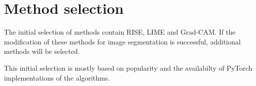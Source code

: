 \section{Method selection}
The initial selection of methods contain RISE, LIME and Grad-CAM. If the modification of these methods for image segmentation is successful, additional methods will be selected.

This initial selection is mostly based on popularity and the availabilty of PyTorch implementations of the algorithms.